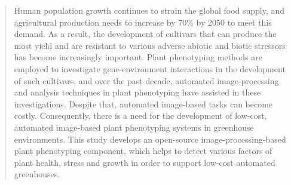 \begin{abstract}
Human population growth continues to strain the global food supply, and agricultural production needs to increase by 70\% by 2050 to meet this demand. As a result, the development of cultivars that can produce the most yield and are resistant to various adverse abiotic and biotic stressors has become increasingly important. Plant phenotyping methods are employed to investigate gene-environment interactions in the development of such cultivars, and over the past decade, automated image-processing and analysis techniques in plant phenotyping have assisted in these investigations. Despite that, automated image-based tasks can become costly. Consequently, there is a need for the development of low-cost, automated image-based plant phenotyping systems in greenhouse environments. This study develops an open-source image-processing-based plant phenotyping component, which helps to detect various factors of plant health, stress and growth in order to support low-cost automated greenhouses.
\end{abstract}